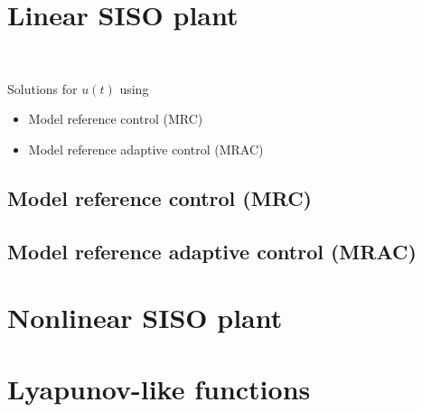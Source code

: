 \section{Linear SISO plant}
~

Solutions for $u(t)$ using
\begin{itemize}
\item Model reference control (MRC)
\item Model reference adaptive control (MRAC)
\end{itemize}

\subsection{Model reference control (MRC)}


\subsection{Model reference adaptive control (MRAC)}


\section{Nonlinear SISO plant}


\section{Lyapunov-like functions}


